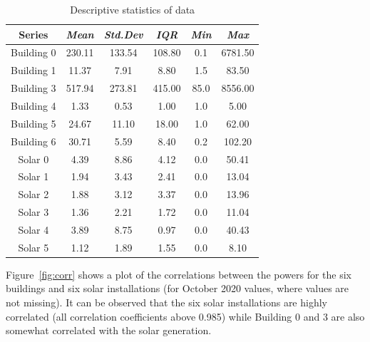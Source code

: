 \documentclass[conference]{IEEEtran}
\begin{document}
\begin{table}[htbp]
\caption{Descriptive statistics of data}
\begin{center}
\begin{tabular}{|c|c|c|c|c|c|}
\hline
\cline{2-6} 
\textbf{Series} & \textbf{\textit{Mean}}& \textbf{\textit{Std.Dev}}& \textbf{\textit{IQR}} & \textbf{\textit{Min}} & \textbf{\textit{Max}}\\
\hline
Building 0 & 230.11	&133.54&	108.80&	0.1	&6781.50\\
Building 1& 11.37&	7.91	&8.80&	1.5	&83.50  \\
Building 3& 517.94&	273.81&	415.00	&85.0&	8556.00 \\
Building 4& 1.33	&0.53&	1.00&	1.0&	5.00  \\
Building 5& 24.67&	11.10&	18.00	&1.0&	62.00 \\
Building 6& 30.71&	5.59&	8.40&	0.2&	102.20  \\
Solar 0 & 4.39&	8.86&	4.12&	0.0&	50.41  \\
Solar 1& 1.94&	3.43&	2.41	&0.0&	13.04 \\
Solar 2& 1.88&	3.12&	3.37&	0.0	&13.96  \\
Solar 3& 1.36&	2.21&	1.72&	0.0	&11.04 \\
Solar 4& 3.89&	8.75&	0.97&	0.0	&40.43\\
Solar 5& 1.12&	1.89&	1.55&	0.0&	8.10  \\
\hline
\end{tabular}
\label{tab:descdata}
\end{center}
\end{table}

Figure~\ref{fig:corr} shows a plot of the correlations between the powers for the six buildings and six solar installations (for October 2020 values, where values are not missing). It can be observed that the six solar installations are highly correlated (all correlation coefficients above 0.985) while Building 0 and 3 are also somewhat correlated with the solar generation.
\end{document}
